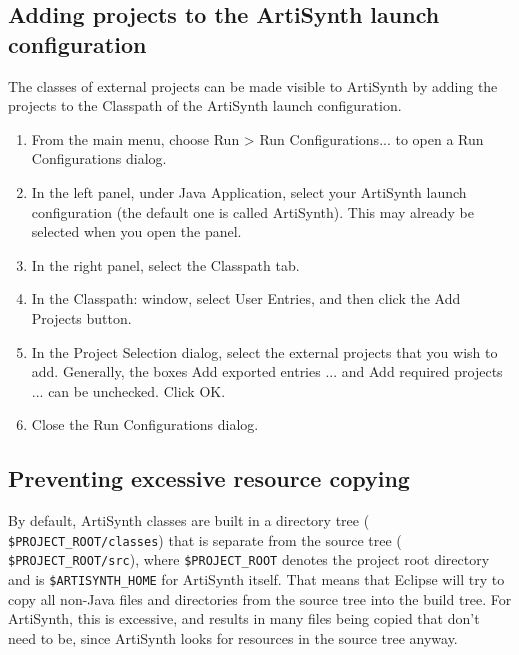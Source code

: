 \documentclass{article}
\def\SEP{/}
\def\directory{directory }
\def\directories{directories }
\begin{document}
\subsection{Adding projects to the ArtiSynth launch configuration}
\label{AddingProjectsToLaunch}

The classes of external projects can be made visible to ArtiSynth by
adding the projects to the Classpath of the ArtiSynth launch
configuration.

\begin{enumerate}

\item From the main menu, choose {\sf Run > Run Configurations...}
to open a {\sf Run Configurations} dialog.

\item In the left panel, under {\sf Java Application}, select your
ArtiSynth launch configuration (the default one is called {\sf
ArtiSynth}). This may already be selected when you open the panel.

\item In the right panel, select the {\sf Classpath} tab.

\item In the {\sf Classpath:} window, select {\sf User Entries},
and then click the {\sf Add Projects} button.

\item In the {\sf Project Selection} dialog, select the external
projects that you wish to add. Generally, the boxes
{\sf Add exported entries ...} and {\sf Add required projects ...}
can be unchecked. Click {\sf OK}.

\item Close the {\sf Run Configurations} dialog.

\end{enumerate}

\subsection{Preventing excessive resource copying}

By default, ArtiSynth classes are built in a \directory tree ({\tt
\$PROJECT\_ROOT\SEP classes}) that is separate from the source tree ({\tt
\$PROJECT\_ROOT\SEP src}), where {\tt \$PROJECT\_ROOT} denotes the project
root \directory and is {\tt \$ARTISYNTH\_HOME} for ArtiSynth itself.
That means that Eclipse will try to copy all non-Java files and
\directories from the source tree into the build tree. For ArtiSynth,
this is excessive, and results in many files being copied that don't
need to be, since ArtiSynth looks for resources in the source tree
anyway.
\end{document}
